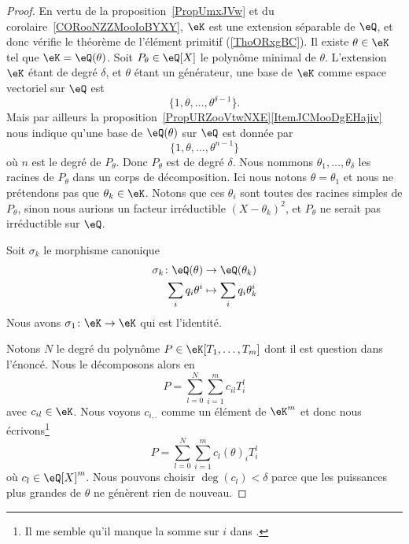 \begin{proof}
    En vertu de la proposition~\ref{PropUmxJVw} et du corolaire~\ref{CORooNZZMooIoBYXY}, \( \eK\) est une extension séparable de \( \eQ\), et donc vérifie le théorème de l'élément primitif (\ref{ThoORxgBC}). Il existe \( \theta\in \eK\) tel que \( \eK=\eQ(\theta)\). Soit \( P_{\theta}\in\eQ[X]\) le polynôme minimal de \( \theta\). L'extension \( \eK\) étant de degré \( \delta\), et \( \theta\) étant un générateur, une base de \( \eK\) comme espace vectoriel sur \( \eQ\) est
    \begin{equation}
        \{ 1,\theta,\ldots, \theta^{\delta-1} \}.
    \end{equation}
    Mais par ailleurs la proposition~\ref{PropURZooVtwNXE}\ref{ItemJCMooDgEHajiv} nous indique qu'une base de \( \eQ(\theta)\) sur \( \eQ\) est donnée par
    \begin{equation}
        \{ 1,\theta,\ldots, \theta^{n-1} \}
    \end{equation}
    où \( n\) est le degré de \( P_{\theta}\). Donc \( P_{\theta}\) est de degré \( \delta\). Nous nommons \( \theta_1,\ldots, \theta_{\delta}\) les racines de \( P_{\theta}\) dans un corps de décomposition. Ici nous notons \( \theta=\theta_1\) et nous ne prétendons pas que \( \theta_k\in \eK\). Notons que ces \( \theta_i\) sont toutes des racines simples de \( P_{\theta}\), sinon nous aurions un facteur irréductible \( (X-\theta_k)^2\), et \( P_{\theta}\) ne serait pas irréductible sur \( \eQ\).

    Soit \( \sigma_k\) le morphisme canonique
    \begin{equation}
        \begin{aligned}
            \sigma_k\colon \eQ(\theta)&\to \eQ(\theta_k) \\
            \sum_i q_i\theta^i&\mapsto \sum_iq_i\theta_k^i
        \end{aligned}
    \end{equation}
    Nous avons \( \sigma_1\colon \eK\to \eK\) qui est l'identité.

    Notons \( N\) le degré du polynôme \( P\in \eK[T_1,\ldots, T_m]\) dont il est question dans l'énoncé. Nous le décomposons alors en
    \begin{equation}
        P=\sum_{l=0}^N\sum_{i=1}^mc_{il}T_i^l
    \end{equation}
    avec \( c_{il}\in \eK\). Nous voyons \( c_{i,.}\) comme un élément de \( \eK^m\) et donc nous écrivons\footnote{Il me semble qu'il manque la somme sur \( i\) dans \cite{fJhCTE}.}
    \begin{equation}
        P=\sum_{l=0}^N\sum_{i=1}^m c_l(\theta)_iT_i^l
    \end{equation}
    où \( c_l\in \eQ[X]^m\). Nous pouvons choisir \( \deg(c_l)<\delta\) parce que les puissances plus grandes de \( \theta\) ne génèrent rien de nouveau.


\end{proof}
